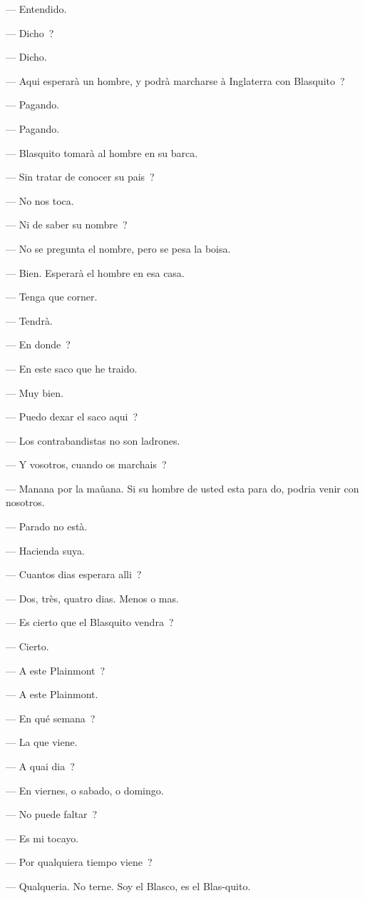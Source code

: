 \documentclass[french,twoside]{book} %
\begin{document}
— Entendido.\par
— Dicho ?\par
— Dicho.\par
— Aqui esperarà un hombre, y podrà marcharse à Inglaterra con Blasquito ?\par
 — Pagando.\par
— Pagando.\par
— Blasquito tomarà al hombre en su barca.\par
— Sin tratar de conocer su pais ?\par
— No nos toca.\par
— Ni de saber su nombre ?\par
— No se pregunta el nombre, pero se pesa la boisa.\par
— Bien. Esperarà el hombre en esa casa.\par
— Tenga que corner.\par
— Tendrà.\par
— En donde ?\par
— En este saco que he traido.\par
— Muy bien.\par
— Puedo dexar el saco aqui ?\par
— Los contrabandistas no son ladrones.\par
— Y vosotros, cuando os marchais ?\par
 — Manana por la maûana. Si su hombre de usted esta para do, podria venir con nosotros.\par
— Parado no està.\par
— Hacienda suya.\par
— Cuantos dias esperara alli ?\par
— Dos, très, quatro dias. Menos o mas.\par
— Es cierto que el Blasquito vendra ?\par
— Cierto.\par
— A este Plainmont ?\par
— A este Plainmont.\par
— En qué semana ?\par
— La que viene.\par
— A quai dia ?\par
— En viernes, o sabado, o domingo.\par
— No puede faltar ?\par
— Es mi tocayo.\par
 — Por qualquiera tiempo viene ?\par
— Qualqueria. No terne. Soy el Blasco, es el Blas-quito.\par
\end{document}
